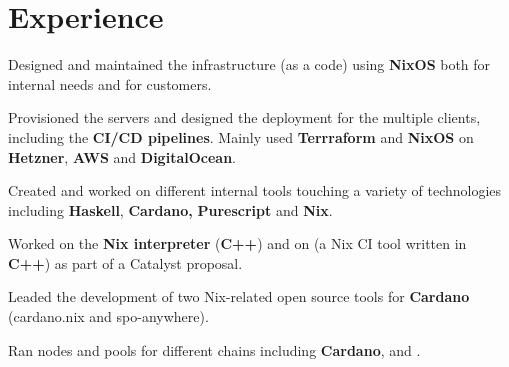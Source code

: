 \documentclass[]{cv}
\begin{document}
%
%

%
%

%
%

\begin{minipage}[t]{0.75\textwidth}


\section{Experience}
\vspace{\topsep} %
\begin{tightemize}
\item Designed and maintained the infrastructure (as a code) using \textbf{NixOS} both for internal needs and for customers. 
\item Provisioned the servers and designed the deployment for the multiple clients, including the \textbf{CI/CD pipelines}. Mainly used \textbf{Terrraform} and \textbf{NixOS} on \textbf{Hetzner}, \textbf{AWS} and \textbf{DigitalOcean}.
\item Created and worked on different internal tools touching a variety of technologies including \textbf{Haskell}, \textbf{Cardano,} \textbf{Purescript} and \textbf{Nix}.
\item Worked on the \textbf{Nix interpreter} (\textbf{C++}) and on  (a Nix CI tool written in \textbf{C++}) as part of a Catalyst proposal.
\item Leaded the development of two Nix-related open source tools for \textbf{Cardano} (cardano.nix and spo-anywhere).
\item Ran nodes and pools for different chains including \textbf{Cardano},  and .
\end{tightemize}
\sectionsep


\end{minipage}
\end{document}

